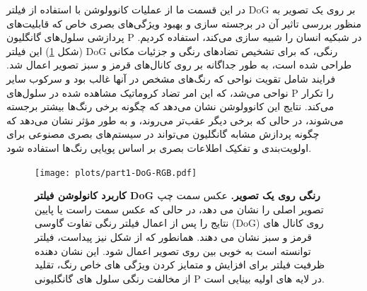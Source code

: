                 در  این قسمت ما از عملیات کانوولوشن با استفاده از فیلتر 
                DoG 
                بر روی یک تصویر به منظور بررسی تاثیر آن در برجسته سازی و بهبود ویژگی‌های بصری خاص که قابلیت‌های پردازشی سلول‌های گانگلیون 
                P 
                در شبکیه انسان را شبیه سازی می‌کند، استفاده کردیم.
                (شکل \ref{fig:part1-DoG-RGB-convolution})
                این فیلتر 
                DoG 
                رنگی، که برای تشخیص تضادهای رنگی و جزئیات مکانی طراحی شده است، به طور جداگانه بر روی کانال‌های قرمز و سبز تصویر اعمال شد. فرایند شامل تقویت نواحی که رنگ‌های مشخص در آنها غالب بود و سرکوب سایر نواحی می‌شد، که این امر تضاد کروماتیک مشاهده شده در سلول‌های 
                P 
                را تکرار می‌کند. نتایج این کانوولوشن نشان می‌دهد که چگونه برخی رنگ‌ها بیشتر برجسته می‌شوند، در حالی که برخی دیگر عقب‌تر می‌روند، و به طور مؤثر نشان می‌دهد که چگونه پردازش مشابه گانگلیون می‌تواند در سیستم‌های بصری مصنوعی برای اولویت‌بندی و تفکیک اطلاعات بصری بر اساس پویایی رنگ‌ها استفاده شود.

                \begin{figure}[!ht]
                    \centering
                    \texttt{[image: plots/part1-DoG-RGB.pdf]} 
                    \captionsetup{width=.7\linewidth}
                    \caption{\textbf{کاربرد کانولوشن فیلتر 
                    DoG
                    رنگی روی یک تصویر.} 
                    عکس سمت چپ تصویر اصلی را نشان می دهد، در حالی که عکس  سمت راست یا پایین نتایج را پس از اعمال فیلتر رنگی تفاوت گاوسی 
                    (DoG) 
                    روی کانال های قرمز و سبز نشان می دهند. همانطور که از شکل نیز پیداست، فیلتر توانسته است به خوبی بین روی تصویر اعمال شود. این نشان دهنده ظرفیت فیلتر برای افزایش و متمایز کردن ویژگی های خاص رنگ، تقلید از مخالفت رنگی سلول های گانگلیونی 
                    P 
                    در لایه های اولیه بینایی است.
                    }
                    \label{fig:part1-DoG-RGB-convolution}
                \end{figure}